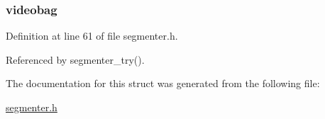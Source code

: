 \hypertarget{struct__transcoder__data_aceb5b4e8609bbec3bf57e52a7f4d865a}{
\subsubsection[{videobag}]{ {\bf videobag}}}\label{struct__transcoder__data_aceb5b4e8609bbec3bf57e52a7f4d865a}


\-Definition at line 61 of file segmenter.\-h.



\-Referenced by segmenter\-\_\-try().



\-The documentation for this struct was generated from the following file\-:\begin{DoxyCompactItemize}
\item 
\hyperlink{segmenter_8h}{segmenter.\-h}\end{DoxyCompactItemize}
